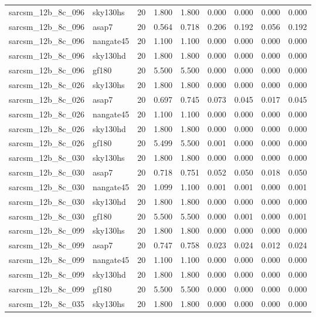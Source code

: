 \begin{tabular}{llrrrrrrr}
sarcsm\_12b\_8c\_096 & sky130hs & 20 & 1.800 & 1.800 & 0.000 & 0.000 & 0.000 & 0.000 \\
sarcsm\_12b\_8c\_096 & asap7 & 20 & 0.564 & 0.718 & 0.206 & 0.192 & 0.056 & 0.192 \\
sarcsm\_12b\_8c\_096 & nangate45 & 20 & 1.100 & 1.100 & 0.000 & 0.000 & 0.000 & 0.000 \\
sarcsm\_12b\_8c\_096 & sky130hd & 20 & 1.800 & 1.800 & 0.000 & 0.000 & 0.000 & 0.000 \\
sarcsm\_12b\_8c\_096 & gf180 & 20 & 5.500 & 5.500 & 0.000 & 0.000 & 0.000 & 0.000 \\
sarcsm\_12b\_8c\_026 & sky130hs & 20 & 1.800 & 1.800 & 0.000 & 0.000 & 0.000 & 0.000 \\
sarcsm\_12b\_8c\_026 & asap7 & 20 & 0.697 & 0.745 & 0.073 & 0.045 & 0.017 & 0.045 \\
sarcsm\_12b\_8c\_026 & nangate45 & 20 & 1.100 & 1.100 & 0.000 & 0.000 & 0.000 & 0.000 \\
sarcsm\_12b\_8c\_026 & sky130hd & 20 & 1.800 & 1.800 & 0.000 & 0.000 & 0.000 & 0.000 \\
sarcsm\_12b\_8c\_026 & gf180 & 20 & 5.499 & 5.500 & 0.001 & 0.000 & 0.000 & 0.000 \\
sarcsm\_12b\_8c\_030 & sky130hs & 20 & 1.800 & 1.800 & 0.000 & 0.000 & 0.000 & 0.000 \\
sarcsm\_12b\_8c\_030 & asap7 & 20 & 0.718 & 0.751 & 0.052 & 0.050 & 0.018 & 0.050 \\
sarcsm\_12b\_8c\_030 & nangate45 & 20 & 1.099 & 1.100 & 0.001 & 0.001 & 0.000 & 0.001 \\
sarcsm\_12b\_8c\_030 & sky130hd & 20 & 1.800 & 1.800 & 0.000 & 0.000 & 0.000 & 0.000 \\
sarcsm\_12b\_8c\_030 & gf180 & 20 & 5.500 & 5.500 & 0.000 & 0.001 & 0.000 & 0.001 \\
sarcsm\_12b\_8c\_099 & sky130hs & 20 & 1.800 & 1.800 & 0.000 & 0.000 & 0.000 & 0.000 \\
sarcsm\_12b\_8c\_099 & asap7 & 20 & 0.747 & 0.758 & 0.023 & 0.024 & 0.012 & 0.024 \\
sarcsm\_12b\_8c\_099 & nangate45 & 20 & 1.100 & 1.100 & 0.000 & 0.000 & 0.000 & 0.000 \\
sarcsm\_12b\_8c\_099 & sky130hd & 20 & 1.800 & 1.800 & 0.000 & 0.000 & 0.000 & 0.000 \\
sarcsm\_12b\_8c\_099 & gf180 & 20 & 5.500 & 5.500 & 0.000 & 0.000 & 0.000 & 0.000 \\
sarcsm\_12b\_8c\_035 & sky130hs & 20 & 1.800 & 1.800 & 0.000 & 0.000 & 0.000 & 0.000 \\

\end{tabular}

